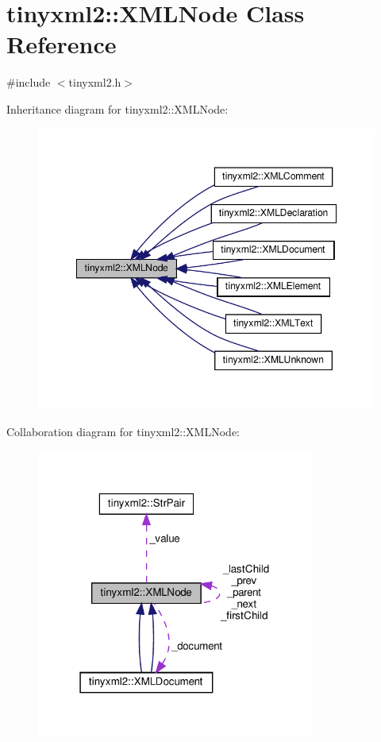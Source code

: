 \hypertarget{classtinyxml2_1_1XMLNode}{}\section{tinyxml2\+:\+:X\+M\+L\+Node Class Reference}
\label{classtinyxml2_1_1XMLNode}


{\ttfamily \#include $<$tinyxml2.\+h$>$}



Inheritance diagram for tinyxml2\+:\+:X\+M\+L\+Node\+:
\nopagebreak
\begin{figure}[H]
\begin{center}
\leavevmode
\includegraphics[width=348pt]{classtinyxml2_1_1XMLNode__inherit__graph}
\end{center}
\end{figure}


Collaboration diagram for tinyxml2\+:\+:X\+M\+L\+Node\+:
\nopagebreak
\begin{figure}[H]
\begin{center}
\leavevmode
\includegraphics[width=259pt]{classtinyxml2_1_1XMLNode__coll__graph}
\end{center}
\end{figure}
